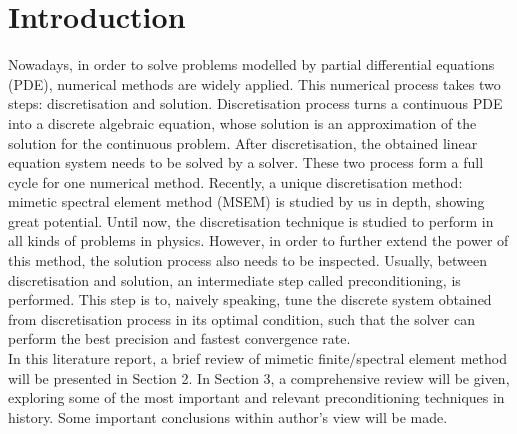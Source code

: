 \section{Introduction}
Nowadays, in order to solve problems modelled by partial differential equations (PDE), numerical methods are widely applied. This numerical process takes two steps: discretisation and solution. Discretisation process turns a continuous PDE into a discrete algebraic equation, whose solution is an approximation of the solution for the continuous problem. After discretisation, the obtained linear equation system needs to be solved by a solver. These two process form a full cycle for one numerical method. Recently, a unique discretisation method: mimetic spectral element method (MSEM) is studied by us in depth, showing great potential. Until now, the discretisation technique is studied to perform in all kinds of problems in physics. However, in order to further extend the power of this method, the solution process also needs to be inspected. Usually, between discretisation and solution, an intermediate step called preconditioning, is performed. This step is to, naively speaking, tune the discrete system obtained from discretisation process in its optimal condition, such that the solver can perform the best precision and fastest convergence rate. \\

In this literature report, a brief review of mimetic finite/spectral element method will be presented in Section 2. In Section 3, a comprehensive review will be given, exploring some of the most important and relevant preconditioning techniques in history. Some important conclusions within author's view will be made. \\    





















  